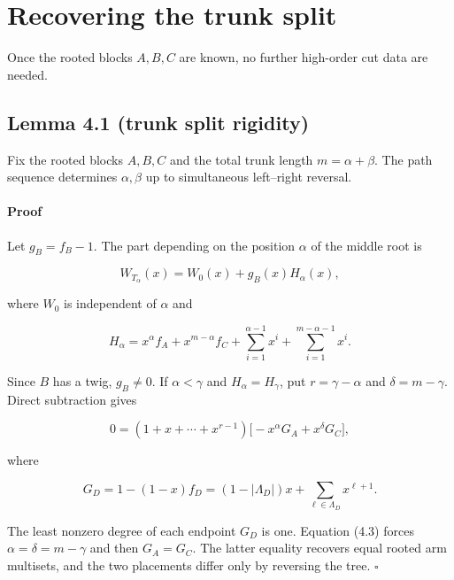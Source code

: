 \documentclass[11pt]{article}
\begin{document}
\section{Recovering the trunk split}


Once the rooted blocks $A,B,C$ are known, no further high-order cut data are needed.

\Needspace{0.13\textheight}
\subsection*{Lemma 4.1 (trunk split rigidity)}


Fix the rooted blocks $A,B,C$ and the total trunk length $m=\alpha+\beta$. The path sequence
determines $\alpha,\beta$ up to simultaneous left--right reversal.

\paragraph{Proof}


Let $g_B=f_B-1$. The part depending on the position $\alpha$ of the middle root is

\begin{equation*}
W_{T_\alpha}(x)=W_0(x)+g_B(x)H_\alpha(x),
\tag{4.1}
\end{equation*}


where $W_0$ is independent of $\alpha$ and

\begin{equation*}
H_\alpha=x^\alpha f_A+x^{m-\alpha}f_C
+\sum_{i=1}^{\alpha-1}x^i+\sum_{i=1}^{m-\alpha-1}x^i.
\tag{4.2}
\end{equation*}


Since $B$ has a twig, $g_B\neq0$. If $\alpha<\gamma$ and $H_\alpha=H_\gamma$, put
$r=\gamma-\alpha$ and $\delta=m-\gamma$. Direct subtraction gives

\begin{equation*}
0=(1+x+\cdots+x^{r-1})
\bigl[-x^\alpha G_A+x^\delta G_C\bigr],
\tag{4.3}
\end{equation*}


where

\begin{equation*}
G_D=1-(1-x)f_D=(1-|\Lambda_D|)x+
\sum_{\ell\in\Lambda_D}x^{\ell+1}.
\end{equation*}


The least nonzero degree of each endpoint $G_D$ is one. Equation (4.3) forces
$\alpha=\delta=m-\gamma$ and then $G_A=G_C$. The latter equality recovers equal rooted arm
multisets, and the two placements differ only by reversing the tree. $\square$
\end{document}
